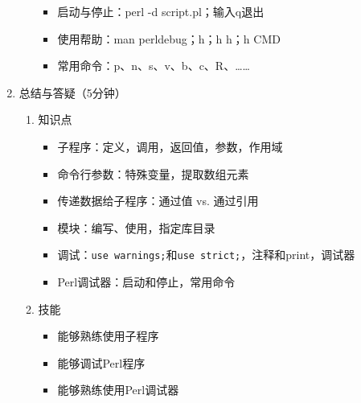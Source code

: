 \documentclass{TIJMUjiaoanLL}
\begin{document}
\begin{enumerate}
\begin{enumerate}
\begin{itemize}
	  \item 启动与停止：perl -d script.pl；输入q退出
	  \item 使用帮助：man perldebug；h；h h；h CMD
	  \item 常用命令：p、n、s、v、b、c、R、……
	\end{itemize}
    \end{enumerate}
  \item 总结与答疑（5分钟）
    \begin{enumerate}
      \item 知识点
	\begin{itemize}
	  \item 子程序：定义，调用，返回值，参数，作用域
	  \item 命令行参数：特殊变量，提取数组元素
	  \item 传递数据给子程序：通过值 vs. 通过引用
	  \item 模块：编写、使用，指定库目录
	  \item 调试：\verb|use warnings;|和\verb|use strict;|，注释和print，调试器
	  \item Perl调试器：启动和停止，常用命令
	\end{itemize}
      \item 技能
	\begin{itemize}
	  \item 能够熟练使用子程序
	  \item 能够调试Perl程序
	  \item 能够熟练使用Perl调试器
	\end{itemize}
    \end{enumerate}
\end{enumerate}

\otherTail

\end{document}
